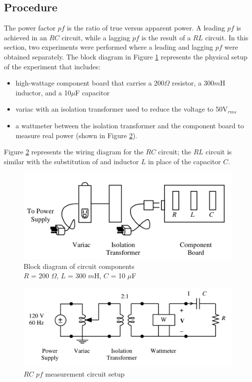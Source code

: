 \documentclass[12pt]{article}
\begin{document}
\subsection{Procedure}\label{sec:pow_procedure}
The power factor $pf$ is the ratio of true versus apparent power. A leading $pf$ is achieved in an $RC$ circuit, while a lagging $pf$ is the result of a $RL$ circuit. In this section, two experiments were performed where a leading and lagging $pf$ were obtained separately. The block diagram in Figure \ref {fig:comp_diagram} represents the physical setup of the experiment that includes: 
\begin{itemize}
	\item high-wattage component board that carries a 200$\Omega$ resistor, a 300$m$H inductor, and a 10$\mu$F capacitor
	\item variac with an isolation transformer used to reduce the voltage to 50V$_{rms}$
	\item a wattmeter between the isolation transformer and the component board to measure real power (shown in Figure \ref {fig:pf_circuit}). 
\end{itemize}
Figure \ref {fig:pf_circuit} represents the wiring diagram for the $RC$ circuit; the $RL$ circuit is similar with the substitution of and inductor $L$ in place of the capacitor $C$.

\begin{figure}[h]
	\centering
	\includegraphics[scale=0.75]{power_components}
	\caption{Block diagram of circuit components\\$R$ = 200 $\Omega$, $L$ = 300 $m$H, $C$ = 10 $\mu$F}
	\label{fig:comp_diagram}
\end{figure}

\begin{figure}[h]
	\centering
	\includegraphics[scale=0.75]{pf_circuit}
	\caption{$RC$ $pf$ measurement circuit setup}
	\label{fig:pf_circuit}
\end{figure}
\end{document}
